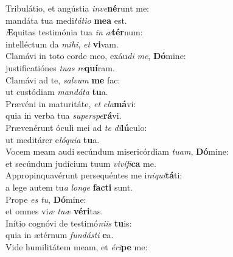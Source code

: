 \oddverse Tribulátio, et angústia \textit{in}\textit{ve}\textbf{né}runt me:~\*\\
\oddverse mandáta tua medi\textit{tá}\textit{ti}\textit{o} \textbf{me}\textbf{a} est.\\
\evenverse Æquitas testimónia tua \textit{in} \textit{æ}\textbf{tér}num:~\*\\
\evenverse intelléctum da \textit{mi}\textit{hi}, \textit{et} \textbf{vi}vam.\\
\oddverse Clamávi in toto corde meo, exáu\textit{di} \textit{me}, \textbf{Dó}mine:~\*\\
\oddverse justificatiónes \textit{tu}\textit{as} \textit{re}\textbf{quí}ram.\\
\evenverse Clamávi ad te, \textit{sal}\textit{vum} \textbf{me} fac:~\*\\
\evenverse ut custódiam \textit{man}\textit{dá}\textit{ta} \textbf{tu}a.\\
\oddverse Prævéni in maturitáte, \textit{et} \textit{cla}\textbf{má}vi:~\*\\
\oddverse quia in verba tua \textit{su}\textit{per}\textit{spe}\textbf{rá}vi.\\
\evenverse Prævenérunt óculi mei ad \textit{te} \textit{di}\textbf{lú}culo:~\*\\
\evenverse ut meditárer e\textit{ló}\textit{qui}\textit{a} \textbf{tu}a.\\
\oddverse Vocem meam audi secúndum misericórdiam \textit{tu}\textit{am}, \textbf{Dó}mine:~\*\\
\oddverse et secúndum judícium tuum \textit{vi}\textit{ví}\textit{fi}\textbf{ca} me.\\
\evenverse Appropinquavérunt persequéntes me i\textit{ni}\textit{qui}\textbf{tá}ti:~\*\\
\evenverse a lege autem tu\textit{a} \textit{lon}\textit{ge} \textbf{fa}\textbf{cti} sunt.\\
\oddverse Prope \textit{es} \textit{tu}, \textbf{Dó}mine:~\*\\
\oddverse et omnes vi\textit{æ} \textit{tu}\textit{æ} \textbf{vé}\textbf{ri}tas.\\
\evenverse Inítio cognóvi de testimó\textit{ni}\textit{is} \textbf{tu}is:~\*\\
\evenverse quia in ætérnum \textit{fun}\textit{dá}\textit{sti} \textbf{e}a.\\
\oddverse Vide humilitátem meam, et \textit{é}\textit{ri}\textbf{pe} me:~\*\\
